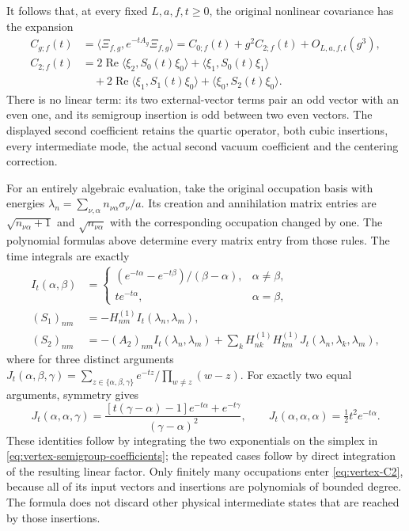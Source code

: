 It follows that, at every fixed $L,a,f,t\ge0$, the original nonlinear
covariance has the expansion
\begin{align}
 C_{g;f}(t)&=\langle\Xi_{f,g},e^{-tA_g}\Xi_{f,g}\rangle
       =C_{0;f}(t)+g^2 C_{2;f}(t)+O_{L,a,f,t}(g^3),
       \label{eq:vertex-C2}\\
 C_{2;f}(t)&=2\operatorname{Re}\langle\xi_2,S_0(t)\xi_0\rangle
       +\langle\xi_1,S_0(t)\xi_1\rangle\nonumber\\
 &\quad+2\operatorname{Re}\langle\xi_1,S_1(t)\xi_0\rangle
       +\langle\xi_0,S_2(t)\xi_0\rangle .\nonumber
\end{align}
There is no linear term: its two external-vector terms pair an odd
vector with an even one, and its semigroup insertion is odd between
two even vectors. The displayed second coefficient retains the
quartic operator, both cubic insertions, every intermediate mode,
the actual second vacuum coefficient and the centering correction.

For an entirely algebraic evaluation, take the original occupation
basis with energies $\lambda_n=\sum_{\nu,\alpha}n_{\nu\alpha}
\sigma_\nu/a$. Its creation and annihilation matrix entries are
$\sqrt{n_{\nu\alpha}+1}$ and $\sqrt{n_{\nu\alpha}}$ with the
corresponding occupation changed by one. The polynomial formulas
above determine every matrix entry from those rules. The time
integrals are exactly
\begin{align}
 I_t(\alpha,\beta)&=
 \begin{cases}(e^{-t\alpha}-e^{-t\beta})/(\beta-\alpha),&\alpha\ne\beta,\\
 t e^{-t\alpha},&\alpha=\beta,
 \end{cases}\nonumber\\
 (S_1)_{nm}&=-H^{(1)}_{nm}I_t(\lambda_n,\lambda_m),\nonumber\\
 (S_2)_{nm}&=-(A_2)_{nm}I_t(\lambda_n,\lambda_m)
       +\sum_kH^{(1)}_{nk}H^{(1)}_{km}
                      J_t(\lambda_n,\lambda_k,\lambda_m),
       \label{eq:vertex-time-matrices}
\end{align}
where for three distinct arguments
$J_t(\alpha,\beta,\gamma)=
\sum_{z\in\{\alpha,\beta,\gamma\}}
e^{-tz}/\prod_{w\ne z}(w-z)$.
For exactly two equal arguments, symmetry gives
\[
 J_t(\alpha,\alpha,\gamma)=
 \frac{[t(\gamma-\alpha)-1]e^{-t\alpha}+e^{-t\gamma}}
                  {(\gamma-\alpha)^2},\qquad
 J_t(\alpha,\alpha,\alpha)=\tfrac12t^2e^{-t\alpha}.
\]
These identities follow by integrating the two exponentials on the
simplex in \eqref{eq:vertex-semigroup-coefficients}; the repeated
cases follow by direct integration of the resulting linear factor.
Only finitely many occupations enter \eqref{eq:vertex-C2}, because
all of its input vectors and insertions are polynomials of bounded
degree. The formula does not discard other physical intermediate
states that are reached by those insertions.

